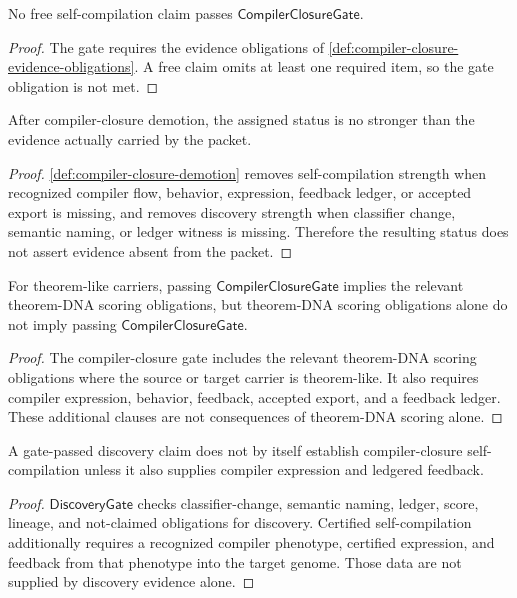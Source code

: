 \begin{theorem}
\label{thm:compiler-closure-no-free-claim-passes}
No free self-compilation claim passes $\mathsf{CompilerClosureGate}$.
\end{theorem}
\begin{proof}
The gate requires the evidence obligations of
\autoref{def:compiler-closure-evidence-obligations}. A free claim omits at
least one required item, so the gate obligation is not met.
\end{proof}

\begin{theorem}
\label{thm:compiler-closure-demotion-no-strengthening}
After compiler-closure demotion, the assigned status is no stronger than the
evidence actually carried by the packet.
\end{theorem}
\begin{proof}
\autoref{def:compiler-closure-demotion} removes self-compilation strength when
recognized compiler flow, behavior, expression, feedback ledger, or accepted
export is missing, and removes discovery strength when classifier change,
semantic naming, or ledger witness is missing. Therefore the resulting status
does not assert evidence absent from the packet.
\end{proof}

\begin{theorem}
\label{thm:compiler-closure-gate-strengthens-tdcs}
For theorem-like carriers, passing $\mathsf{CompilerClosureGate}$ implies the
relevant theorem-DNA scoring obligations, but theorem-DNA scoring obligations
alone do not imply passing $\mathsf{CompilerClosureGate}$.
\end{theorem}
\begin{proof}
The compiler-closure gate includes the relevant theorem-DNA scoring
obligations where the source or target carrier is theorem-like. It also
requires compiler expression, behavior, feedback, accepted export, and a
feedback ledger. These additional clauses are not consequences of theorem-DNA
scoring alone.
\end{proof}

\begin{theorem}
\label{thm:compiler-closure-discovery-gate-alone-not-closure}
A gate-passed discovery claim does not by itself establish compiler-closure
self-compilation unless it also supplies compiler expression and ledgered
feedback.
\end{theorem}
\begin{proof}
$\mathsf{DiscoveryGate}$ checks classifier-change, semantic naming, ledger,
score, lineage, and not-claimed obligations for discovery. Certified
self-compilation additionally requires a recognized compiler phenotype,
certified expression, and feedback from that phenotype into the target genome.
Those data are not supplied by discovery evidence alone.
\end{proof}

